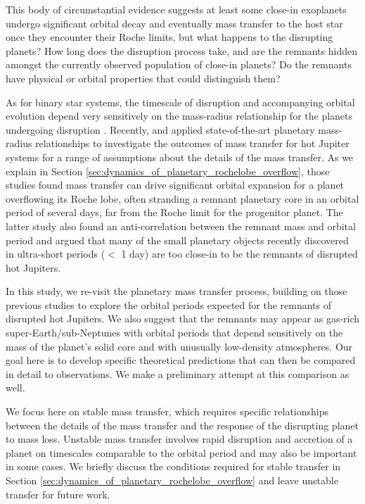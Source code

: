 \documentclass{svjour3}                     %
\begin{document}
This body of circumstantial evidence suggests at least some close-in exoplanets undergo significant orbital decay and eventually mass transfer to the host star once they encounter their Roche limits, but what happens to the disrupting planets? How long does the disruption process take, and are the remnants hidden amongst the currently observed population of close-in planets? Do the remnants have physical or orbital properties that could distinguish them? 

As for binary star systems, the timescale of disruption and accompanying orbital evolution depend very sensitively on the mass-radius relationship for the planets undergoing disruption \cite{Rappaport1982}. Recently, \cite{2014ApJ...793L...3V} and \cite{2015ApJ...813..101V} applied state-of-the-art planetary mass-radius relationships to investigate the outcomes of mass transfer for hot Jupiter systems for a range of assumptions about the details of the mass transfer. As we explain in Section \ref{sec:dynamics_of_planetary_rochelobe_overflow}, those studies found mass transfer can drive significant orbital expansion for a planet overflowing its Roche lobe, often stranding a remnant planetary core in an orbital period of several days, far from the Roche limit for the progenitor planet. The latter study also found an anti-correlation between the remnant mass and orbital period and argued that many of the small planetary objects recently discovered in ultra-short periods ($<$ 1 day) \cite{2014ApJ...787...47S}\cite{2016arXiv160306488A} are too close-in to be the remnants of disrupted hot Jupiters.

In this study, we re-visit the planetary mass transfer process, building on those previous studies to explore the orbital periods expected for the remnants of disrupted hot Jupiters. We also suggest that the remnants may appear as gas-rich super-Earth/sub-Neptunes with orbital periods that depend sensitively on the mass of the planet's solid core and with unusually low-density atmospheres. Our goal here is to develop specific theoretical predictions that can then be compared in detail to observations. We make a preliminary attempt at this comparison as well.

We focus here on stable mass transfer, which requires specific relationships between the details of the mass transfer and the response of the disrupting planet to mass loss. Unstable mass transfer involves rapid disruption and accretion of a planet on timescales comparable to the orbital period \cite{2002ApJ...565.1107P} and may also be important in some cases. We briefly discuss the conditions required for stable transfer in Section \ref{sec:dynamics_of_planetary_rochelobe_overflow} and leave unstable transfer for future work.
\end{document}
